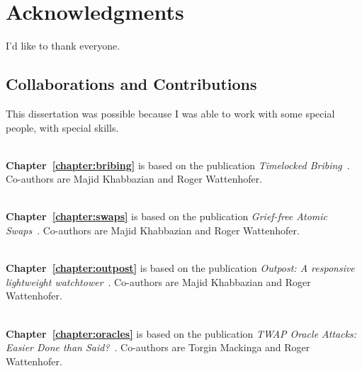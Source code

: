 \chapter*{Acknowledgments}

I'd like to thank everyone.

\section*{Collaborations and Contributions}

\newcommand\chapterlistheader[1]{~\\ \noindent\textbf{\mbox{#1}}}

This dissertation was possible because I was able to work with some special people, with special skills. 

\chapterlistheader{Chapter~\ref{chapter:bribing}} is based on the publication \emph{Timelocked Bribing}~\cite{timelocked_bribing}. Co-authors are Majid Khabbazian and Roger Wattenhofer.

\chapterlistheader{Chapter~\ref{chapter:swaps}} is based on the publication \emph{Grief-free Atomic Swaps}~\cite{grief_free_atomic_swaps}. Co-authors are Majid Khabbazian and Roger Wattenhofer.


\chapterlistheader{Chapter~\ref{chapter:outpost}} is based on the publication \emph{Outpost: A responsive lightweight watchtower}~\cite{outpost}. Co-authors are Majid Khabbazian and Roger Wattenhofer.

\chapterlistheader{Chapter~\ref{chapter:oracles}} is based on the publication \emph{TWAP Oracle Attacks: Easier Done than Said?}~\cite{twap_oracle_attacks}. Co-authors are Torgin Mackinga and Roger Wattenhofer.